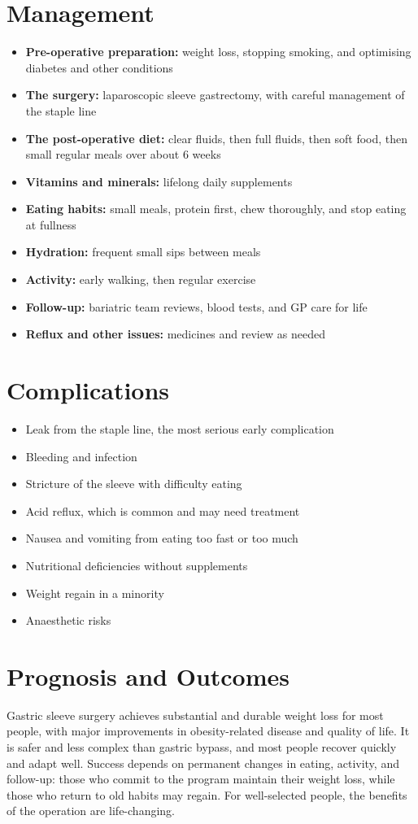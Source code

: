 \section*{Management}
\begin{itemize}
    \item \textbf{Pre-operative preparation:} weight loss, stopping smoking, and optimising diabetes and other conditions
    \item \textbf{The surgery:} laparoscopic sleeve gastrectomy, with careful management of the staple line
    \item \textbf{The post-operative diet:} clear fluids, then full fluids, then soft food, then small regular meals over about 6 weeks
    \item \textbf{Vitamins and minerals:} lifelong daily supplements
    \item \textbf{Eating habits:} small meals, protein first, chew thoroughly, and stop eating at fullness
    \item \textbf{Hydration:} frequent small sips between meals
    \item \textbf{Activity:} early walking, then regular exercise
    \item \textbf{Follow-up:} bariatric team reviews, blood tests, and GP care for life
    \item \textbf{Reflux and other issues:} medicines and review as needed
\end{itemize}

\section*{Complications}
\begin{itemize}
    \item Leak from the staple line, the most serious early complication
    \item Bleeding and infection
    \item Stricture of the sleeve with difficulty eating
    \item Acid reflux, which is common and may need treatment
    \item Nausea and vomiting from eating too fast or too much
    \item Nutritional deficiencies without supplements
    \item Weight regain in a minority
    \item Anaesthetic risks
\end{itemize}

\section*{Prognosis and Outcomes}
Gastric sleeve surgery achieves substantial and durable weight loss for most people, with major improvements in obesity-related disease and quality of life. It is safer and less complex than gastric bypass, and most people recover quickly and adapt well. Success depends on permanent changes in eating, activity, and follow-up: those who commit to the program maintain their weight loss, while those who return to old habits may regain. For well-selected people, the benefits of the operation are life-changing.


